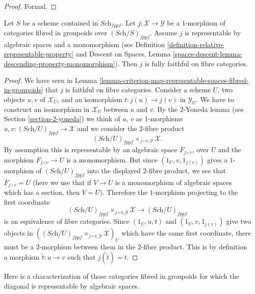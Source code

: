 \begin{proof}
Formal.
\end{proof}

\begin{lemma}
\label{lemma-open-fibred-category-is-full}
Let $S$ be a scheme contained in $\textit{Sch}_{fppf}$. 
Let $j : \mathcal X \to \mathcal Y$ be a $1$-morphism of
categories fibred in groupoids over $(\textit{Sch}/S)_{fppf}$.
Assume $j$ is representable by algebraic spaces and a monomorphism
(see
Definition \ref{definition-relative-representable-property}
and
Descent on Spaces, Lemma
\ref{spaces-descent-lemma-descending-property-monomorphism}).
Then $j$ is fully faithful on fibre categories.
\end{lemma}

\begin{proof}
We have seen in
Lemma \ref{lemma-criterion-map-representable-spaces-fibred-in-groupoids}
that $j$ is faithful on fibre categories. Consider a scheme $U$,
two objects $u, v$ of $\mathcal{X}_U$, and an isomorphism
$t : j(u) \to j(v)$ in $\mathcal{Y}_U$. We have to construct an
isomorphism in $\mathcal{X}_U$ between $u$ and $v$.
By the $2$-Yoneda lemma (see Section \ref{section-2-yoneda})
we think of $u$, $v$ as $1$-morphisms 
$u, v : (\textit{Sch}/U)_{fppf} \to \mathcal{X}$
and we consider the $2$-fibre product
$$
(\textit{Sch}/U)_{fppf} \times_{j \circ v, \mathcal{Y}} \mathcal{X}.
$$
By assumption this is representable by an algebraic space 
$F_{j \circ v}$, over $U$ and the morphism
$F_{j \circ v} \to U$ is a monomorphism.
But since $(1_U, v, 1_{j(v)})$ gives a $1$-morphism of
$(\textit{Sch}/U)_{fppf}$ into the displayed $2$-fibre product,
we see that $F_{j \circ v} = U$ (here we use
that if $V \to U$ is a monomorphism of algebraic spaces which has a
section, then $V = U$). Therefore the $1$-morphism projecting to 
the first coordinate
$$
(\textit{Sch}/U)_{fppf} \times_{j \circ v, \mathcal{Y}} \mathcal{X} 
\to (\textit{Sch}/U)_{fppf}
$$
is an equivalence of fibre categories. 
Since $(1_U, u, t)$ and $(1_U, v, 1_{j(v)})$ give two 
objects in $((\textit{Sch}/U)_{fppf} \times_{j \circ v, \mathcal{Y}} 
\mathcal{X})_U$ which have the same first coordinate, there must
be a $2$-morphism between them in the $2$-fibre product. 
This is by definition a morphism $\tilde t : u \to v$ such that
$j(\tilde t) = t$. 
\end{proof}

\noindent
Here is a characterization of those categories fibred in groupoids
for which the diagonal is representable by algebraic spaces.

